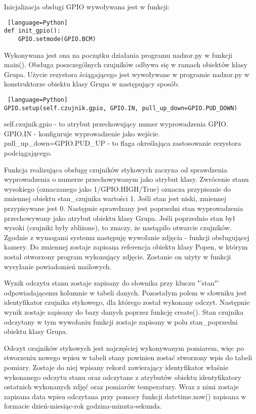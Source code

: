 \documentclass[a4paper,12pt,twoside]{article}
\begin{document}
Inicjalizacja obsługi GPIO wywoływana jest w funkcji:  
\begin{lstlisting} [language=Python]
def init_gpio():
    GPIO.setmode(GPIO.BCM)
\end{lstlisting}
Wykonywana jest ona na początku działania programu nadzor.py w funkcji main(). Obsługa poszczególnych czujników odbywa się w ramach obiektów klasy Grupa. Użycie rezystora ściągającego jest wywoływane w programie nadzor.py w konstruktorze obiektu klasy Grupa w następujący sposób.
\begin{lstlisting} [language=Python]
GPIO.setup(self.czujnik.gpio, GPIO.IN, pull_up_down=GPIO.PUD_DOWN)
\end{lstlisting}
self.czujnik.gpio - to atrybut przechowujący numer wyprowadzenia GPIO.
GPIO.IN - konfiguruje wyprowadzenie jako wejście.
pull{\_}up{\_}down=GPIO.PUD{\_}UP - to flaga określająca zastosowanie rezystora podciągającego.

Funkcja realizująca obsługę czujników stykowych zaczyna od sprawdzenia wyprowadzenia o numerze przechowywanym jako atrybut klasy. Zwrócenie stanu wysokiego (oznaczanego jako 1/GPIO.HIGH/True) oznacza przypisanie do zmiennej obiektu stan{\_}czujnika wartości 1. Jeśli stan jest niski, zmiennej przypisywane jest 0. Następnie sprawdzany jest poprzedni stan wyprowadzenia przechowywany jako atrybut obiektu klasy Grupa. Jeśli poprzednio stan był wysoki (czujniki były zbliżone), to znaczy, że nastąpiło otwarcie czujników. Zgodnie z wymogami systemu następuję wywołanie zdjęcia - funkcji obsługującej kamery. Do zmiennej zostaje zapisana referencja obiektu klasy Popen, w którym został otworzony program wykonujący zdjęcie. Zostanie on użyty w funkcji wysyłanie powiadomień mailowych.

Wynik odczytu stanu zostaje zapisany do słownika przy kluczu "'stan"' odpowiadającemu kolumnie w tabeli danych. Pozostałym polem w słowniku jest identyfikator czujnika stykowego, dla którego został wykonany odczyt. Następnie wynik zostaje zapisany do bazy danych poprzez funkcję create(). Stan czujnika odczytany w tym wywołaniu funkcji zostaje zapisany w polu stan{\_}poprzedni obiektu klasy Grupa. 

Odczyt czujników stykowych jest najczęściej wykonywanym pomiarem, więc po stworzeniu nowego wpisu w tabeli stany powinien zostać stworzony wpis do tabeli pomiary. Zostaje do niej wpisany rekord zawierający identyfikator właśnie wykonanego odczytu stanu oraz odczytane z atrybutów obiektu identyfikatory ostatnich wykonanych zdjęć oraz pomiarów temperatury. Wraz z nimi zostaje zapisana data wpisu odczytana przy pomocy funkcji datetime.now() zapisana w formacie dzień-miesiąc-rok godzina-minuta-sekunda.
\end{document}
